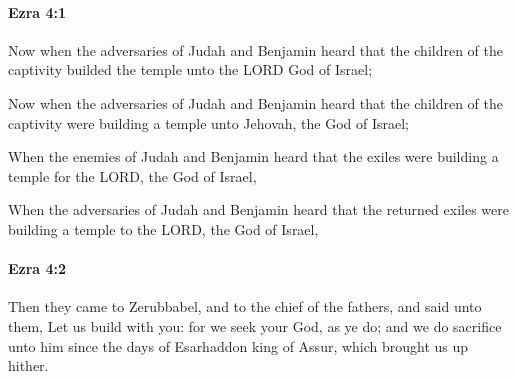 		\paragraph{Ezra 4:1} %
			\label{EZRA-4-1}

			Now when the adversaries of Judah and Benjamin heard that the children of the captivity builded the temple unto the LORD God of Israel;

			\begin{versebox}
					\item[BHS] 
					\item[LXX] 
					\item[ASV] Now when the adversaries of Judah and Benjamin heard that the children of the captivity were building a temple unto Jehovah, the God of Israel;
					\item[NIV] When the enemies of Judah and Benjamin heard that the exiles were building a temple for the LORD, the God of Israel,
					\item[NRSV] When the adversaries of Judah and Benjamin heard that the returned exiles were building a temple to the LORD, the God of Israel,
			\end{versebox}

		\paragraph{Ezra 4:2} %
			\label{EZRA-4-2}

			Then they came to Zerubbabel, and to the chief of the fathers, and said unto them, Let us build with you: for we seek your God, as ye do; and we do sacrifice unto him since the days of Esarhaddon king of Assur, which brought us up hither.

